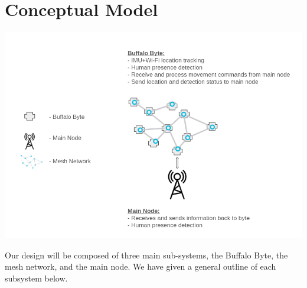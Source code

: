 \documentclass[10pt]{article}
\begin{document}
\section*{Conceptual Model}
\begin{center}
\includegraphics[scale=0.4]{conceptual-model}\\
\end{center}
Our design will be composed of three main sub-systems, the Buffalo Byte, the mesh network, and the main node. We have given a general outline of each subsystem below.
\end{document}
